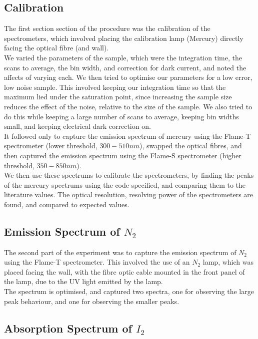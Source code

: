 \documentclass{article}
\begin{document}
\subsection{Calibration}
\label{sec:calibration}
The first section section of the procedure was the calibration of the spectrometers, which involved placing the calibration lamp (Mercury) directly facing the optical fibre (and wall).\\
\indent We varied the parameters of the sample, which were the integration time, the scans to average, the bin width, and correction for dark current, and noted the affects of varying each. We then tried to optimise our parameters for a low error, low noise sample. This involved keeping our integration time so that the maximum lied under the saturation point, since increasing the sample size reduces the effect of the noise, relative to the size of the sample. We also tried to do this while keeping a large number of scans to average, keeping bin widths small, and keeping electrical dark correction on.\\
\indent It followed only to capture the emission spectrum of mercury using the Flame-T spectrometer (lower threshold, $300-510nm$), swapped the optical fibres, and then captured the emission spectrum using the Flame-S spectrometer (higher threshold, $350-850nm$).\\
\indent We then use these spectrums to calibrate the spectrometers, by finding the peaks of the mercury spectrums using the code specified, and comparing them to the literature values. The optical resolution, resolving power of the spectrometers are found, and compared to expected values.\\
\indent 
\subsection{Emission Spectrum of $N_2$}
The second part of the experiment was to capture the emission spectrum of $N_2$ using the Flame-T spectrometer. This involved the use of an $N_2$ lamp, which was placed facing the wall, with the fibre optic cable mounted in the front panel of the lamp, due to the UV light emitted by the lamp.\\
\indent The spectrum is optimised, and captured two spectra, one for observing the large peak behaviour, and one for observing the smaller peaks. 
\subsection{Absorption Spectrum of $I_2$}
\end{document}
